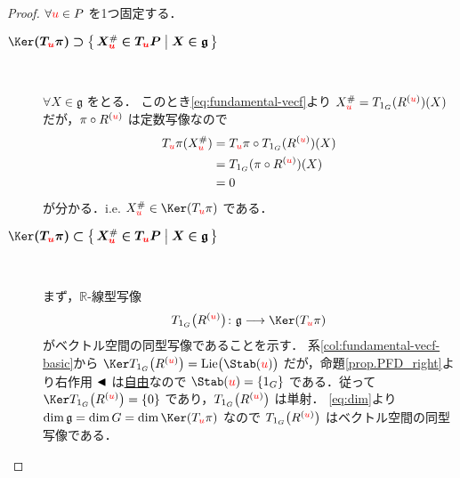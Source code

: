 \documentclass[geometry_main]{subfiles}
\begin{document}
\begin{proof}
    $\forall \textcolor{red}{u} \in P$ を1つ固定する．
    \begin{description}
        \item[\textbf{$\bm{\Ker (T_{\textcolor{red}{u}} \pi) \supset \bigl\{\, X^\#_{\textcolor{red}{u}} \in T_{\textcolor{red}{u}} P \bigm| X \in \mathfrak{g} \,\bigr\}}$}]　
        
        $\forall X \in \mathfrak{g}$ をとる．
        このとき\eqref{eq:fundamental-vecf}より $X^\#_{\textcolor{red}{u}} = T_{1_G}(R^{(\textcolor{red}{u})})(X)$ だが，$\pi \circ R^{(\textcolor{red}{u})}$ は定数写像なので
        \begin{align}
            T_{\textcolor{red}{u}}\pi (X^\#_{\textcolor{red}{u}}) &= T_{\textcolor{red}{u}}\pi \circ T_{1_G}(R^{(\textcolor{red}{u})})(X) \\
            &= T_{1_G}(\pi \circ R^{(\textcolor{red}{u})}) (X) \\
            &= 0
        \end{align}
        が分かる．i.e. $X^\#_{\textcolor{red}{u}} \in \Ker (T_{\textcolor{red}{u}} \pi)$ である．
    
        \item[\textbf{$\bm{\Ker (T_{\textcolor{red}{u}} \pi) \subset \bigl\{\, X^\#_{\textcolor{red}{u}} \in T_{\textcolor{red}{u}} P \bigm| X \in \mathfrak{g} \,\bigr\}}$}]　
        
        まず，$\mathbb{R}$-線型写像
        \begin{align}
            T_{1_G}\bigl(R^{(\textcolor{red}{u})} \bigr) \colon \mathfrak{g} \lto \Ker (T_{\textcolor{red}{u}} \pi)
        \end{align}
        がベクトル空間の同型写像であることを示す．
        系\ref{col:fundamental-vecf-basic}から $\Ker T_{1_G}\bigl(R^{(\textcolor{red}{u})} \bigr) = \mathrm{Lie}\bigl( \Stab (\textcolor{red}{u}) \bigr)$ だが，命題\ref{prop.PFD_right}より右作用 $\blacktriangleleft$ は\hyperref[def:Lie-action]{自由}なので $ \Stab (\textcolor{red}{u}) = \{1_G\}$ である．従って $\Ker T_{1_G}\bigl(R^{(\textcolor{red}{u})} \bigr) = \{0\}$ であり，$T_{1_G}\bigl(R^{(\textcolor{red}{u})} \bigr)$ は単射．
        \eqref{eq:dim}より $\dim \mathfrak{g} = \dim G = \dim \Ker (T_{\textcolor{red}{u}} \pi)$ なので $T_{1_G}\bigl(R^{(\textcolor{red}{u})} \bigr)$ はベクトル空間の同型写像である．
        

\end{description}
\end{proof}
\end{document}
